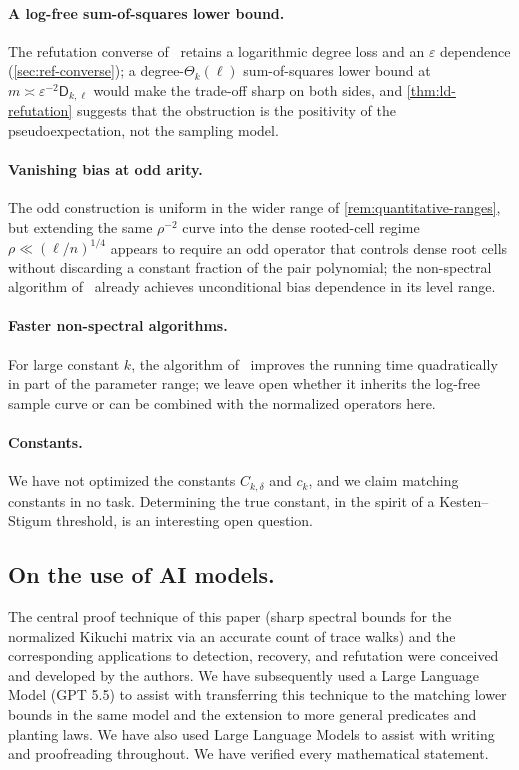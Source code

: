 \documentclass[11pt]{article}
\theoremstyle{definition}
\theoremstyle{remark}
\newcommand{\1}{\mathbf 1}
\newcommand{\eps}{\varepsilon}
\newcommand{\Dkl}{\mathsf D_{k,\ell}}
\numberwithin{equation}{section}
\begin{document}
\paragraph{A log-free sum-of-squares lower bound.}
The refutation converse of~\cite{KMOW} retains a logarithmic degree
loss and an $\eps$ dependence (\cref{sec:ref-converse}); a
degree-$\Theta_k(\ell)$ sum-of-squares lower bound at
$m\asymp\eps^{-2}\Dkl$ would make the trade-off sharp on both sides,
and \cref{thm:ld-refutation} suggests that the obstruction is the
positivity of the pseudoexpectation, not the sampling model.

\paragraph{Vanishing bias at odd arity.}
The odd construction is uniform in the wider range of
\cref{rem:quantitative-ranges}, but extending the same $\rho^{-2}$
curve into the dense rooted-cell regime $\rho\ll(\ell/n)^{1/4}$
appears to require an odd operator that controls dense root cells
without discarding a constant fraction of the pair polynomial; the
non-spectral algorithm of~\cite{Mao2026} already achieves
unconditional bias dependence in its level range.


\paragraph{Faster non-spectral algorithms.}
For large constant $k$, the algorithm of~\cite{GHOS}
improves the running time quadratically in part of the parameter range; we leave open
whether it inherits the log-free sample curve or can be combined with
the normalized operators here.

\paragraph{Constants.}
We have not optimized the constants $C_{k,\delta}$ and $c_k$, and we
claim matching constants in no task. Determining the true constant, in the spirit of a
Kesten--Stigum threshold, is an interesting open question.

\bigskip


\subsection*{On the use of AI models.}
The central proof technique of this paper (sharp spectral bounds for
the normalized Kikuchi matrix via an accurate count of trace
walks) and the corresponding applications to detection, recovery, and refutation were conceived and developed by the authors. We have subsequently used a Large Language Model (GPT 5.5) to assist with transferring this technique to the matching lower bounds in the same model and the extension to more general predicates and planting laws. We have
 also used Large Language Models to assist with writing and proofreading throughout. We have verified every mathematical
statement. 
\end{document}
